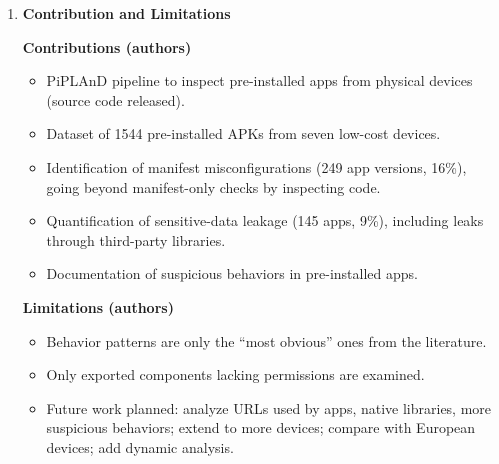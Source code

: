 \documentclass[11pt,a4paper]{article}
\newcommand{\entrypart}[1]{\textbf{\color{accent}#1}\par\vspace{2pt}}
\begin{document}
\begin{enumerate}
\begin{itemize}[leftmargin=*,itemsep=1pt,topsep=2pt]
\begin{itemize}[itemsep=0pt]
        \end{itemize}
        \item \textbf{Ecosystem observations:}
        \begin{itemize}[itemsep=0pt]
            \item Most pre-installed apps are not on Google Play (Fig.~1).
            \item Apps sit in many folders beyond \texttt{/system/app} and \texttt{/system/priv-app} (Fig.~2).
            \item Palm Store is pre-installed on the examined devices.
        \end{itemize}
    \end{itemize}

    \item \entrypart{Contribution and Limitations}

    \textbf{Contributions (authors)}
    \begin{itemize}[leftmargin=*,itemsep=1pt,topsep=2pt]
        \item PiPLAnD pipeline to inspect pre-installed apps from physical devices (source code released).
        \item Dataset of 1544 pre-installed APKs from seven low-cost devices.
        \item Identification of manifest misconfigurations (249 app versions, 16\%), going beyond manifest-only checks by inspecting code.
        \item Quantification of sensitive-data leakage (145 apps, 9\%), including leaks through third-party libraries.
        \item Documentation of suspicious behaviors in pre-installed apps.
    \end{itemize}

    \vspace{4pt}
    \textbf{Limitations (authors)}
    \begin{itemize}[leftmargin=*,itemsep=1pt,topsep=2pt]
        \item Behavior patterns are only the ``most obvious'' ones from the literature.
        \item Only exported components lacking permissions are examined.
        \item Future work planned: analyze URLs used by apps, native libraries, more suspicious behaviors; extend to more devices; compare with European devices; add dynamic analysis.
    \end{itemize}


\end{enumerate}
\end{document}

